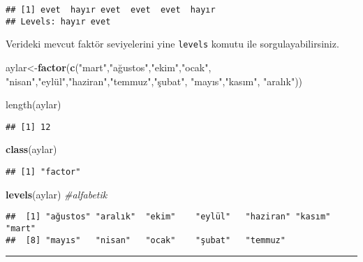 \documentclass[
]{book}
\newenvironment{Shaded}{\begin{snugshade}}{\end{snugshade}}
\newcommand{\CommentTok}[1]{\textcolor[rgb]{0.56,0.35,0.01}{\textit{#1}}}
\newcommand{\KeywordTok}[1]{\textcolor[rgb]{0.13,0.29,0.53}{\textbf{#1}}}
\newcommand{\NormalTok}[1]{#1}
\newcommand{\StringTok}[1]{\textcolor[rgb]{0.31,0.60,0.02}{#1}}
\begin{document}
\begin{verbatim}
## [1] evet  hayır evet  evet  evet  hayır
## Levels: hayır evet
\end{verbatim}

Verideki mevcut faktör seviyelerini yine \texttt{levels} komutu ile sorgulayabilirsiniz.

\begin{Shaded}
\begin{Highlighting}[]
\NormalTok{aylar<-}\KeywordTok{factor}\NormalTok{(}\KeywordTok{c}\NormalTok{(}\StringTok{"mart"}\NormalTok{,}\StringTok{"ağustos"}\NormalTok{,}\StringTok{"ekim"}\NormalTok{,}\StringTok{"ocak"}\NormalTok{, }\StringTok{"nisan"}\NormalTok{,}\StringTok{"eylül","}\NormalTok{haziran}\StringTok{","}\NormalTok{temmuz}\StringTok{","}\NormalTok{şubat}\StringTok{",}
\StringTok{                "}\NormalTok{mayıs}\StringTok{","}\NormalTok{kasım}\StringTok{", "}\NormalTok{aralık}\StringTok{"))}

\StringTok{length(aylar)}
\end{Highlighting}
\end{Shaded}

\begin{verbatim}
## [1] 12
\end{verbatim}

\begin{Shaded}
\begin{Highlighting}[]
\KeywordTok{class}\NormalTok{(aylar)}
\end{Highlighting}
\end{Shaded}

\begin{verbatim}
## [1] "factor"
\end{verbatim}

\begin{Shaded}
\begin{Highlighting}[]
\KeywordTok{levels}\NormalTok{(aylar) }\CommentTok{#alfabetik}
\end{Highlighting}
\end{Shaded}

\begin{verbatim}
##  [1] "ağustos" "aralık"  "ekim"    "eylül"   "haziran" "kasım"   "mart"
##  [8] "mayıs"   "nisan"   "ocak"    "şubat"   "temmuz"
\end{verbatim}

\begin{center}\rule{0.5\linewidth}{0.5pt}\end{center}
\end{document}
